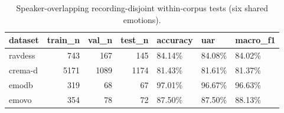 \begin{table}
\caption{Speaker-overlapping recording-disjoint within-corpus tests (six shared emotions).}
\begin{tabular}{lrrrlll}
\toprule
dataset & train_n & val_n & test_n & accuracy & uar & macro_f1 \\
\midrule
ravdess & 743 & 167 & 145 & 84.14\% & 84.08\% & 84.02\% \\
crema-d & 5171 & 1089 & 1174 & 81.43\% & 81.61\% & 81.37\% \\
emodb & 319 & 68 & 67 & 97.01\% & 96.67\% & 96.63\% \\
emovo & 354 & 78 & 72 & 87.50\% & 87.50\% & 88.13\% \\
\bottomrule
\end{tabular}
\end{table}
